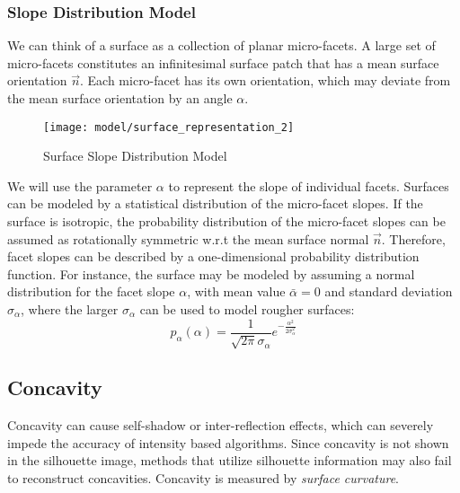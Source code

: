 \subsubsection{Slope Distribution Model}
We can think of a surface as a collection of planar micro-facets. A large set of micro-facets constitutes an infinitesimal surface patch that has a mean surface orientation $\vec{n}$. Each micro-facet has its own orientation, which may deviate from the mean surface orientation by an angle $\alpha$.
\begin{figure}[h]
\centering
\texttt{[image: model/surface\_representation\_2]}
\caption{Surface Slope Distribution Model}
\end{figure}

We will use the parameter $\alpha$ to represent the slope of individual facets. Surfaces can be modeled by a statistical distribution of the micro-facet slopes. If the surface is isotropic, the probability distribution of the micro-facet slopes can be assumed as rotationally symmetric w.r.t the mean surface normal $\vec{n}$.  Therefore, facet slopes can be described by a one-dimensional probability distribution function. For instance, the surface may be modeled by assuming a normal distribution for the facet slope $\alpha$, with mean value $\bar{\alpha}=0$ and standard deviation $\sigma_\alpha$, where the larger $\sigma_\alpha$ can be used to model rougher surfaces:
$$
p_\alpha(\alpha)=\frac{1}{\sqrt{2\pi}\sigma_\alpha}e^{-\frac{\alpha^2}{2\sigma_\alpha^2}}
$$



\subsection{Concavity}
Concavity can cause self-shadow or inter-reflection effects, which can severely impede the accuracy of intensity based algorithms. Since concavity is not shown in the silhouette image, methods that utilize silhouette information may also fail to reconstruct concavities. Concavity is measured by \textit{surface curvature}.

